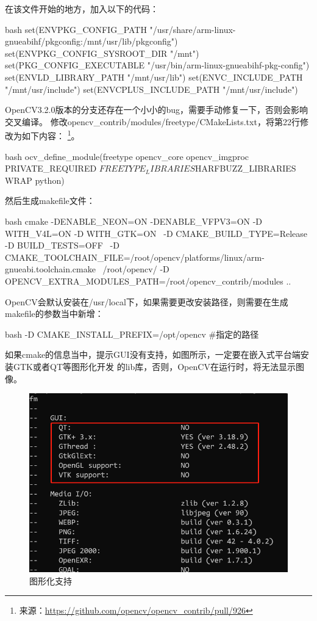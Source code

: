 \begin{outline}[enumerate]
在该文件开始的地方，加入以下的代码：
\begin{code-in-enumerate}{bash}
set(ENV{PKG_CONFIG_PATH} "/usr/share/arm-linux-gnueabihf/pkgconfig:/mnt/usr/lib/pkgconfig")
set(ENV{PKG_CONFIG_SYSROOT_DIR} "/mnt")
set(PKG_CONFIG_EXECUTABLE "/usr/bin/arm-linux-gnueabihf-pkg-config")
set(ENV{LD_LIBRARY_PATH} "/mnt/usr/lib")
set(ENV{C_INCLUDE_PATH} "/mnt/usr/include")
set(ENV{CPLUS_INCLUDE_PATH} "/mnt/usr/include")
\end{code-in-enumerate}

OpenCV3.2.0版本的分支还存在一个小小的bug，需要手动修复一下，否则会影响交叉编译。
修改opencv\_contrib/modules/freetype/CMakeLists.txt，将第22行修改为如下内容：
\footnote{来源：\url{https://github.com/opencv/opencv_contrib/pull/926}}。
\begin{code-in-enumerate}{bash}
ocv_define_module(freetype opencv_core opencv_imgproc PRIVATE_REQUIRED ${FREETYPE_LIBRARIES} ${HARFBUZZ_LIBRARIES} WRAP python)
\end{code-in-enumerate}

然后生成makefile文件：
\begin{code-in-enumerate}{bash}
cmake -DENABLE_NEON=ON -DENABLE_VFPV3=ON  -D WITH_V4L=ON  -D WITH_GTK=ON \
    -D CMAKE_BUILD_TYPE=Release -D BUILD_TESTS=OFF \
    -D CMAKE_TOOLCHAIN_FILE=/root/opencv/platforms/linux/arm-gnueabi.toolchain.cmake \
    /root/opencv/ -D OPENCV_EXTRA_MODULES_PATH=/root/opencv_contrib/modules ..
\end{code-in-enumerate}

OpenCV会默认安装在/usr/local下，如果需要更改安装路径，则需要在生成makefile的参数当中新增：
\begin{code-in-enumerate}{bash}
-D CMAKE_INSTALL_PREFIX=/opt/opencv #指定的路径
\end{code-in-enumerate}

如果cmake的信息当中，提示GUI没有支持，如图所示，一定要在嵌入式平台端安装GTK或者QT等图形化开发
的lib库，否则，OpenCV在运行时，将无法显示图像。
\begin{figure}[H]
  \centering
  \includegraphics[scale=0.3]{cross_gui.png}
  \caption{图形化支持}
  \label{fig:cross_gui}
\end{figure}


\end{outline}
